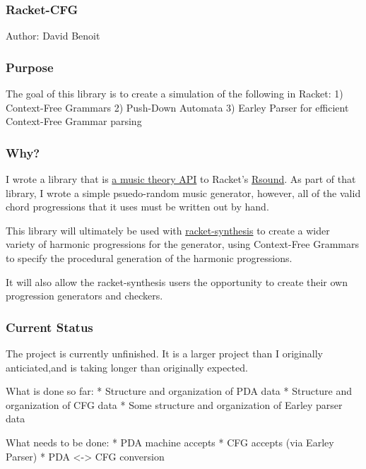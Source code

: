 \subsubsection{Racket-CFG}\label{racket-cfg}

Author: David Benoit

\subsubsection{Purpose}\label{purpose}

The goal of this library is to create a simulation of the following in
Racket: 1) Context-Free Grammars 2) Push-Down Automata 3) Earley Parser
for efficient Context-Free Grammar parsing

\subsubsection{Why?}\label{why}

I wrote a library that is
\href{https://github.com/benoid/racket-synthesis}{a music theory API} to
Racket's \href{https://github.com/jbclements/RSound}{Rsound}. As part of
that library, I wrote a simple psuedo-random music generator, however,
all of the valid chord progressions that it uses must be written out by
hand.

This library will ultimately be used with
\href{https://github.com/benoid/racket-synthesis}{racket-synthesis} to
create a wider variety of harmonic progressions for the generator, using
Context-Free Grammars to specify the procedural generation of the
harmonic progressions.

It will also allow the racket-synthesis users the opportunity to create
their own progression generators and checkers.

\subsubsection{Current Status}\label{current-status}

The project is currently unfinished. It is a larger project than I
originally anticiated,and is taking longer than originally expected.

What is done so far: * Structure and organization of PDA data *
Structure and organization of CFG data * Some structure and organization
of Earley parser data

What needs to be done: * PDA machine accepts * CFG accepts (via Earley
Parser) * PDA \textless{}-\textgreater{} CFG conversion
